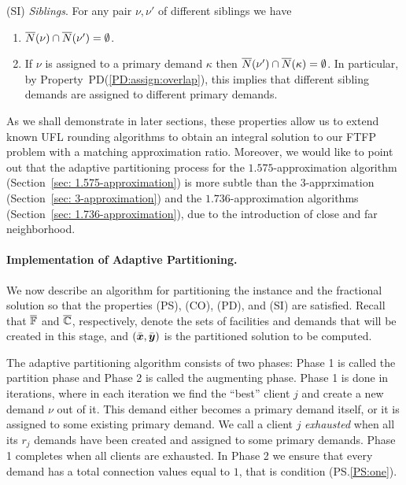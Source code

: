 \documentclass[11pt]{article}
\begin{document}
\begin{description}
\begin{enumerate}
\begin{enumerate}
			\end{enumerate}

	\end{enumerate}
	
\item{(SI)} \emph{Siblings}. For any pair $\nu,\nu'$ of different siblings we have
  \begin{enumerate}

	\item \label{SI:siblings disjoint}
		  ${\overline{N}}(\nu)\cap {\overline{N}}(\nu') = \emptyset$.
		
	\item \label{SI:primary disjoint} If $\nu$ is assigned to a primary demand $\kappa$ then
 		${\overline{N}}(\nu')\cap {\overline{N}}(\kappa) = \emptyset$. In particular, by Property~PD(\ref{PD:assign:overlap}),
		this implies that different sibling demands are assigned to different primary demands.

	\end{enumerate}
	
\end{description}

As we shall demonstrate in later sections, these properties allow us
to extend known UFL rounding algorithms to obtain an integral solution
to our FTFP problem with a matching approximation ratio. Moreover, we
would like to point out that the adaptive partitioning process for the
$1.575$-approximation algorithm (Section~\ref{sec:
  1.575-approximation}) is more subtle than the $3$-apprximation
(Section~\ref{sec: 3-approximation}) and the $1.736$-approximation
algorithms (Section~\ref{sec: 1.736-approximation}), due to the
introduction of close and far neighborhood.


\paragraph{Implementation of Adaptive Partitioning.}
We now describe an algorithm for partitioning the instance
and the fractional solution so that the properties (PS),
(CO), (PD), and (SI) are satisfied.  Recall that
$\overline{\mathbb{F}}$ and $\overline{\mathbb{C}}$, respectively, denote the
sets of facilities and demands that will be created in this
stage, and $(\bar{\boldsymbol{x}},\bar{\boldsymbol{y}})$ is the partitioned solution
to be computed. 

The adaptive partitioning algorithm consists of two phases:
Phase 1 is called the partition phase and Phase 2 is called
the augmenting phase. Phase 1 is done in iterations, where
in each iteration we find the ``best'' client $j$ and create a
new demand $\nu$ out of it. This demand either becomes a
primary demand itself, or it is assigned to some existing
primary demand. We call a client $j$ \emph{exhausted} when
all its $r_j$ demands have been created and assigned to some
primary demands. Phase 1 completes when all clients are
exhausted. In Phase 2 we ensure that every demand has a
total connection values equal to $1$, that is condition (PS.\ref{PS:one}).
\end{document}
